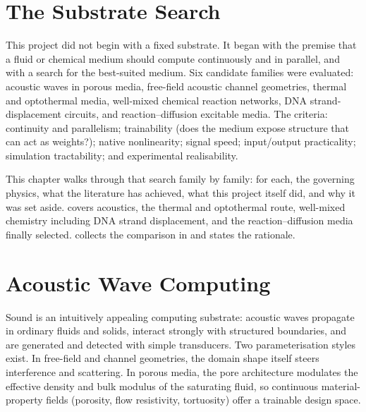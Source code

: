
\section{The Substrate Search}
\label{sec:substrate_search}

This project did not begin with a fixed substrate. It began with the premise that a fluid or chemical medium should compute continuously and in parallel, and with a search for the best-suited medium. Six candidate families were evaluated: acoustic waves in porous media, free-field acoustic channel geometries, thermal and optothermal media, well-mixed chemical reaction networks, DNA strand-displacement circuits, and reaction--diffusion excitable media. The criteria: continuity and parallelism; trainability (does the medium expose structure that can act as weights?); native nonlinearity; signal speed; input/output practicality; simulation tractability; and experimental realisability.

This chapter walks through that search family by family: for each, the governing physics, what the literature has achieved, what this project itself did, and why it was set aside.  covers acoustics,  the thermal and optothermal route,  well-mixed chemistry including DNA strand displacement, and  the reaction--diffusion media finally selected.  collects the comparison in  and states the rationale.

\section{Acoustic Wave Computing}
\label{sec:sub_acoustic}

Sound is an intuitively appealing computing substrate: acoustic waves propagate in ordinary fluids and solids, interact strongly with structured boundaries, and are generated and detected with simple transducers. Two parameterisation styles exist. In free-field and channel geometries, the domain shape itself steers interference and scattering. In porous media, the pore architecture modulates the effective density and bulk modulus of the saturating fluid, so continuous material-property fields (porosity, flow resistivity, tortuosity) offer a trainable design space.

